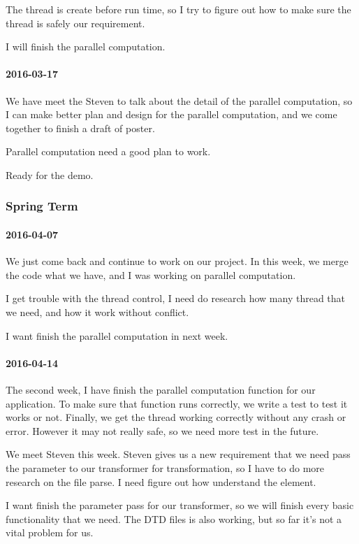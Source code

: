The thread is create before run time, so I try to figure out how to make sure the thread is safely our requirement.


I will finish the parallel computation.

\paragraph{2016-03-17}
We have meet the Steven to talk about the detail of the parallel computation, so I can make better plan and design for the parallel computation, and we come together to finish a draft of poster.


Parallel computation need a good plan to work.


Ready for the demo.

\subsubsection{Spring Term}

\paragraph{2016-04-07}
We just come back and continue to work on our project. In this week, we merge the code what we have, and I was working on parallel computation.


I get trouble with the thread control, I need do research how many thread that we need, and how it work without conflict.


I want finish the parallel computation in next week.

\paragraph{2016-04-14}
The second week, I have finish the parallel computation function for our application. To make sure that function runs correctly, we write a test to test it works or not. Finally, we get the thread working correctly without any crash or error. However it may not really safe, so we need more test in the future.


We meet Steven this week. Steven gives us a new requirement that we need pass the parameter to our transformer for transformation, so I have to do more research on the   file parse. I need figure out how   understand the element.


I want finish the parameter pass for our transformer, so we will finish every basic functionality that we need. The  DTD files is also working, but so far it's not a vital problem for us.

